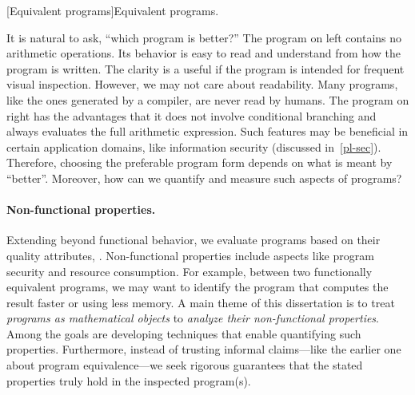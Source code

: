 \begin{center}
\captionsetup{type=lstlisting}
\begin{minipage}{.3\textwidth}

\end{minipage}%
\hspace{5em}%
\begin{minipage}{.4\textwidth}
\captionsetup{type=lstlisting}

\end{minipage}
[Equivalent programs]{Equivalent programs.}
\label{lst:intro}
\end{center}

It is natural to ask, \enquote{which program is better?} The program on left
contains no arithmetic operations. Its behavior is easy to read and understand
from how the program is written. The clarity is a useful if the program is
intended for frequent visual inspection. However, we may not care about
readability. Many programs, like the ones generated by a compiler, are never
read by humans. The program on right has the advantages that it does not involve
conditional branching and always evaluates the full arithmetic expression. Such
features may be beneficial in certain application domains, like information
security (discussed in~\autoref{pl-sec}). Therefore, choosing the preferable
program form depends on what is meant by \enquote{better}. Moreover, how can we
quantify and measure such aspects of programs?

\paragraph{Non-functional properties.}
Extending beyond functional behavior, we evaluate programs based on their
quality attributes, \ie \emph{}. Non-functional
properties include aspects like program security and resource consumption. For
example, between two functionally equivalent programs, we may want to identify
the program that computes the result faster or using less memory. A main theme
of this dissertation is to treat \emph{programs as mathematical objects} to
\emph{analyze their non-functional properties}. Among the goals are developing
techniques that enable quantifying such properties. Furthermore, instead of
trusting informal claims---like the earlier one about program equivalence---we
seek rigorous guarantees that the stated properties truly hold in the inspected
program(s).

